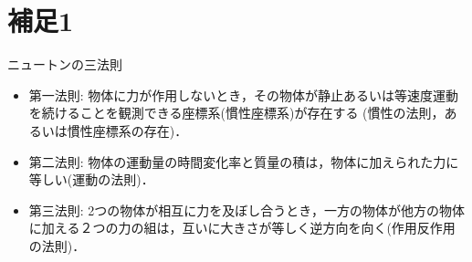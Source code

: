 \documentclass[10pt,a4j]{jbook}
\begin{document}
\section{補足1}
ニュートンの三法則
\begin{itemize}
\item
第一法則:
物体に力が作用しないとき，その物体が静止あるいは等速度運動を続けることを観測できる座標系(慣性座標系)が存在する
		(慣性の法則，あるいは慣性座標系の存在)．
\item
第二法則:
物体の運動量の時間変化率と質量の積は，物体に加えられた力に等しい(運動の法則)．
\item
第三法則:
2つの物体が相互に力を及ぼし合うとき，一方の物体が他方の物体に加える２つの力の組は，互いに大きさが等しく逆方向を向く(作用反作用の法則)．
\end{itemize}
\end{document}
